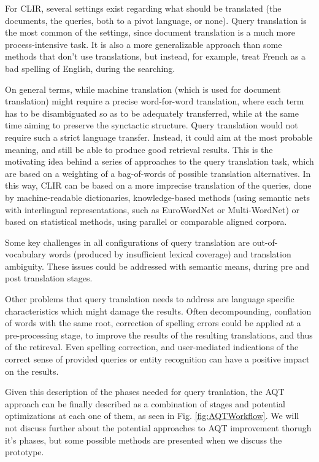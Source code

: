 \documentclass{llncs}
\begin{document}
For CLIR, several settings exist regarding what should be translated (the documents, the queries, both to a pivot language, or none). Query translation is the most common of the settings, since document translation is a much more process-intensive task. It is also a more generalizable approach than some methods that don't use translations, but instead, for example, treat French as a bad spelling of English, during the searching.

On general terms, while machine translation (which is used for document translation) might require a precise word-for-word translation, where each term has to be disambiguated so as to be adequately transferred, while at the same time aiming to preserve the synctactic structure. Query translation would not require such a strict language transfer. Instead, it could aim at the most probable meaning, and still be able to produce good retrieval results. This is the motivating idea behind a series of approaches to the query translation task, which are based on a weighting of a bag-of-words of possible translation alternatives\cite{ballesteros1998resolving}. In this way, CLIR can be based on a more imprecise translation of the queries, done by machine-readable dictionaries, knowledge-based methods (using semantic nets with interlingual representations, such as EuroWordNet or Multi-WordNet) or based on statistical methods, using parallel or comparable aligned corpora. 

Some key challenges in all configurations of query translation are out-of-vocabulary words (produced by insufficient lexical coverage) and translation ambiguity. These issues could be addressed with semantic means, during pre and post translation stages. 

Other problems that query translation needs to address are language specific characteristics which might damage the results. Often decompounding, conflation of words with the same root, correction of spelling errors could be applied at a pre-processing stage, to improve the results of the resulting translations, and thus of the retireval\cite{ahmed2008arabic}. Even spelling correction, and user-mediated indications of the correct sense of provided queries or entity recognition can have a positive impact on the results\cite{de2004ontology}. 

Given this description of the phases needed for query tranlation, the AQT approach can be finally described as a combination of stages and potential optimizations at each one of them, as seen in Fig. \ref{fig:AQTWorkflow}.
We will not discuss further about the potential approaches to AQT improvement thorugh it's phases, but some possible methods are presented when we discuss the prototype.
\end{document}
